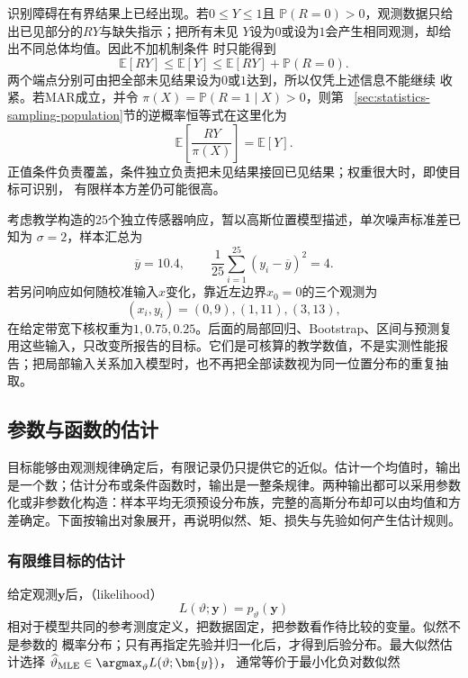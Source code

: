 识别障碍在有界结果上已经出现。若\(0\leq Y\leq1\)且
\(\mathbb{P}(R=0)>0\)，观测数据只给出已见部分的\(RY\)与缺失指示；把所有未见
\(Y\)设为\(0\)或设为\(1\)会产生相同观测，却给出不同总体均值。因此不加机制条件
时只能得到
\[
  \mathbb{E}[RY]
  \leq\mathbb{E}[Y]
  \leq\mathbb{E}[RY]+\mathbb{P}(R=0).
\]
两个端点分别可由把全部未见结果设为\(0\)或\(1\)达到，所以仅凭上述信息不能继续
收紧。若MAR成立，并令
\(\pi(X)=\mathbb{P}(R=1\mid X)>0\)，则第
~\ref{sec:statistics-sampling-population}节的逆概率恒等式在这里化为
\[
  \mathbb{E}\left[\frac{RY}{\pi(X)}\right]
  =\mathbb{E}[Y].
\]
正值条件负责覆盖，条件独立负责把未见结果接回已见结果；权重很大时，即使目标可识别，
有限样本方差仍可能很高。
\begin{example}[贯穿本章的传感器校准数据]
\label{ex:statistics-running-sensor-calibration}
考虑教学构造的\(25\)个独立传感器响应，暂以高斯位置模型描述，单次噪声标准差已知为
\(\sigma=2\)，样本汇总为
\[
\overline y=10.4,\qquad
\frac1{25}\sum_{i=1}^{25}(y_i-\overline y)^2=4.
\]
若另问响应如何随校准输入\(x\)变化，靠近左边界\(x_0=0\)的三个观测为
\[
(x_i,y_i)=(0,9),(1,11),(3,13),
\]
在给定带宽下核权重为\(1,0.75,0.25\)。后面的局部回归、Bootstrap、区间与预测复用这些输入，只改变所报告的目标。它们是可核算的教学数值，不是实测性能报告；把局部输入关系加入模型时，也不再把全部读数视为同一位置分布的重复抽取。
\end{example}

\subsection{参数与函数的估计}
\label{sec:stats-parameter-inference-efficiency}
目标能够由观测规律确定后，有限记录仍只提供它的近似。估计一个均值时，输出是一个数；估计分布或条件函数时，输出是一整条规律。两种输出都可以采用参数化或非参数化构造：样本平均无须预设分布族，完整的高斯分布却可以由均值和方差确定。下面按输出对象展开，再说明似然、矩、损失与先验如何产生估计规则。

\subsubsection{有限维目标的估计}
\label{sec:statistics-likelihood-robustness}
\label{sec:statistics-bayes-hierarchy}
给定观测\(\bm{y}\)后，（likelihood）
\[
  L(\vartheta;\bm{y})=p_\vartheta(\bm{y})
\]
相对于模型共同的参考测度定义，把数据固定，把参数看作待比较的变量。似然不是参数的
概率分布；只有再指定先验并归一化后，才得到后验分布。最大似然估计选择
\(\widehat\vartheta_{\mathrm{MLE}}\in\argmax_\vartheta L(\vartheta;\bm{y})\)，
通常等价于最小化负对数似然

